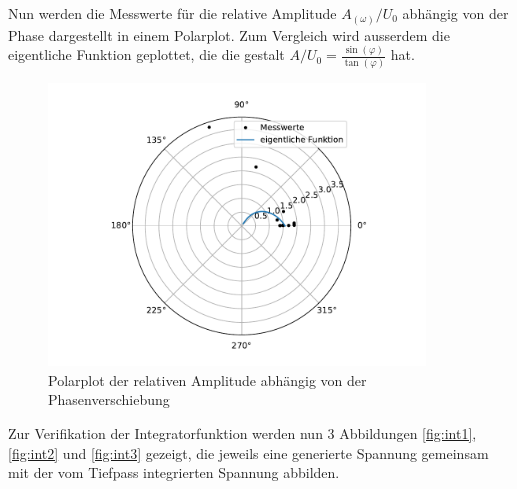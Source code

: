 \newpage

Nun werden die Messwerte für die relative Amplitude $A_{(\omega)}/U_0$ abhängig von der Phase dargestellt in einem Polarplot.
Zum Vergleich wird ausserdem die eigentliche Funktion geplottet, die die gestalt $A/U_0 = \frac{\sin(\varphi)}{\tan(\varphi)}$ hat.

\begin{figure}
\centering
\includegraphics[width = 10cm]{plot4.pdf}
\caption{Polarplot der relativen Amplitude abhängig von der Phasenverschiebung}
\label{fig:plot4}
\end{figure}

\newpage

Zur Verifikation der Integratorfunktion werden nun 3 Abbildungen \ref{fig:int1},  \ref{fig:int2} und \ref{fig:int3} gezeigt, die jeweils eine generierte Spannung gemeinsam mit der vom Tiefpass integrierten Spannung abbilden.

